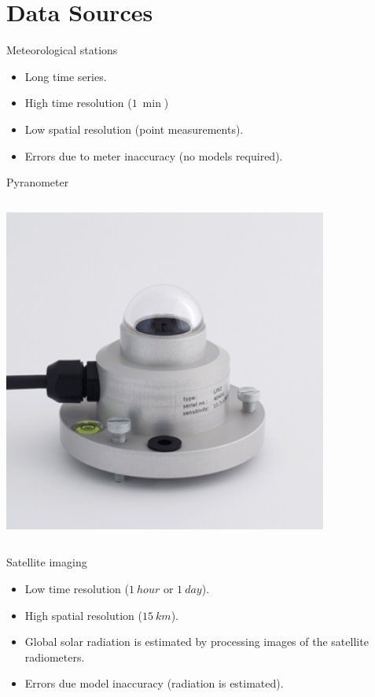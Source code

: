 \documentclass[xcolor={usenames,svgnames,dvipsnames}]{beamer}
\begin{document}
\section{Data Sources}
\label{sec:orgb3c4bc7}
\begin{frame}[label={sec:org8c08b8a}]{Meteorological stations}
\begin{itemize}
\item Long time series.
\item High time resolution (\(\SI{1}{\min}\))
\item Low spatial resolution (point measurements).
\item Errors due to meter inaccuracy (no models required).
\end{itemize}

\begin{block}{Pyranometer}
\end{block}
\begin{columns}
\begin{column}{0.4\columnwidth}
\begin{center}
\begin{center}
\includegraphics[width=0.8\textwidth]{../figs/piranometro.jpg}
\end{center}
\end{center}
\end{column}
\end{columns}
\end{frame}


\begin{frame}[label={sec:orga35a8dd}]{Satellite imaging}
\begin{itemize}
\item Low time resolution (\(\SI{1}{hour}\) or \(\SI{1}{day}\)).

\item High spatial resolution (\(\SI{15}{km}\)).

\item Global solar radiation is estimated by processing images of the satellite radiometers.

\item Errors due model inaccuracy (radiation is estimated).
\end{itemize}
\end{frame}
\end{document}
